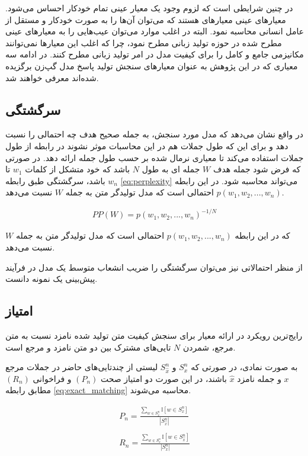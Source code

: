 در چنین شرایطی است که لزوم وجود یک معیار عینی تمام خودکار احساس می‌شود. معیارهای عینی معیارهای هستند که می‌توان  آن‌ها را به صورت خودکار و مستقل از عامل انسانی محاسبه نمود. البته در اغلب موارد می‌توان عیب‌هایی را به معیارهای عینی مطرح شده در حوزه تولید زبانی مطرح نمود، چرا که اغلب این معیارها نمی‌توانند مکانیزمی جامع و کامل را برای کیفیت مدل در امر تولید زبانی مطرح کنند. در ادامه سه معیاری که در این پژوهش به عنوان معیارهای سنجش تولید پاسخ مدل گپ‌زن برگزیده شده‌اند معرفی خواهند شد. 

\subsection{سرگشتگی}
 در واقع نشان می‌دهد که مدل مورد سنجش، به جمله صحیح هدف چه احتمالی را نسبت دهد و برای این که طول جملات هم در این محاسبات موثر نشوند در رابطه از طول جملات استفاده می‌کند تا معیاری نرمال شده بر حسب طول جمله ارائه دهد. در صورتی که فرض شود جمله هدف
$W$
جمله ای به طول 
$N$
باشد که خود متشکل از کلمات
$w_1$ 
تا
$w_n$
باشد، سرگشتگی طبق رابطه
\ref{eq:perplexity}
 می‌تواند محاسبه شود. در این رابطه 
 $p(w_1, w_2, ..., w_n)$
 احتمالی است که مدل تولیدگر متن به جمله 
 $W$
 نسبت می‌دهد. 

\begin{gather} \label{eq:perplexity}
PP(W) = p(w_1, w_2, ..., w_n)^{-1/N}
\end{gather}

که در این رابطه 
$p(w_1, w_2, ..., w_n)$
احتمالی است که مدل تولیدگر متن به جمله 
$W$
نسبت می‌دهد. 

از منظر احتمالاتی نیز می‌توان سرگشتگی را ضریب انشعاب متوسط یک مدل در فرآیند پیش‌بینی یک نمونه دانست.

\subsection{
امتیاز
}

رایج‌ترین رویکرد در ارائه معیار برای سنجش کیفیت متن تولید شده نامزد نسبت به متن مرجع،‌ شمردن 
$N$
تایی‌های مشترک بین دو متن نامزد و مرجع است. 

به صورت نمادی، در صورتی که 
$S_{x}^{n}$
و
$S_{\hat{x}}^{n}$
لیستی از چندتایی‌های حاضر در جملات مرجع 
$x$
و جمله نامزد 
$\hat{x}$
باشند، در این صورت دو امتیاز صحت 
$ (P_n) $
و فراخوانی 
$(R_n)$
مطابق رابطه
\ref{eq:exact_matching}
 محاسبه می‌شوند.

\begin{align}\label{eq:exact_matching}
 P_n = \frac{
\sum_{w \in S_{\hat{x}}^{n} }^{} \mathbb{I}[w \in S_{x}^{n}]
}{|S_{\hat{x}}^{n}|}  \\ \nonumber \\ \nonumber
 R_n = \frac{
	\sum_{w \in S_{x}^{n} }^{} \mathbb{I}[w \in  S_{\hat{x}}^{n}]
}{|S_{x}^{n}|}
\end{align}

